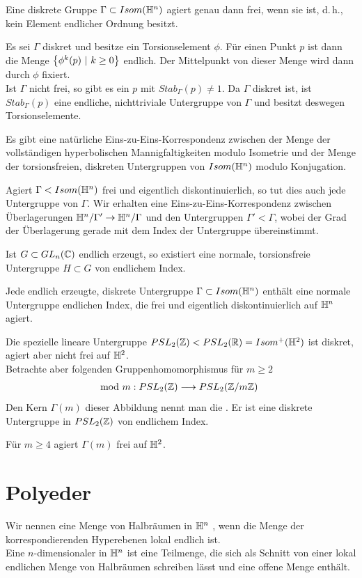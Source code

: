 \documentclass{book}
\begin{document}
\Prop{}
Eine diskrete Gruppe $\Gamma \subset Isom(\mathbb{H}^n)$ agiert genau dann frei, wenn sie  ist, d.\,h., kein Element endlicher Ordnung besitzt.
\begin{Beweis}{}
	Es sei $\Gamma$ diskret und besitze ein Torsionselement $\phi$. Für einen Punkt $p$ ist dann die Menge $\set{\phi^k(p)}{k\geq 0}$ endlich. Der Mittelpunkt von dieser Menge wird dann durch $\phi$ fixiert.\\
	Ist $\Gamma$ nicht frei, so gibt es ein $p$ mit $Stab_\Gamma(p) \neq 1$. Da $\Gamma$ diskret ist, ist $Stab_\Gamma(p)$ eine endliche, nichttriviale Untergruppe von $\Gamma$ und besitzt deswegen Torsionselemente.
\end{Beweis}

\Satz{}
Es gibt eine natürliche Eins-zu-Eins-Korrespondenz zwischen der Menge der vollständigen hyperbolischen Mannigfaltigkeiten modulo Isometrie und der Menge der torsionsfreien, diskreten Untergruppen von $Isom(\mathbb{H}^n)$ modulo Konjugation.

\Satz{}
Agiert $\Gamma < Isom(\mathbb{H}^n)$ frei und eigentlich diskontinuierlich, so tut dies auch jede Untergruppe von $\Gamma$. Wir erhalten eine Eins-zu-Eins-Korrespondenz zwischen Überlagerungen $\mathbb{H}^n / \Gamma' \overset{}{\rightarrow}\mathbb{H}^n / \Gamma$ und den Untergruppen $\Gamma' < \Gamma$, wobei der Grad der Überlagerung gerade mit dem Index der Untergruppe übereinstimmt.

Ist $G \subset GL_n(\mathbb{C})$ endlich erzeugt, so existiert eine normale, torsionsfreie Untergruppe $H \subset G$ von endlichem Index.

\Kor{}
Jede endlich erzeugte, diskrete Untergruppe $\Gamma \subset Isom(\mathbb{H}^n)$ enthält eine normale Untergruppe endlichen Index, die frei und eigentlich diskontinuierlich auf $\mathbb{H}^n$ agiert.

\Def{}
Die spezielle lineare Untergruppe $PSL_2(\mathbb{Z}) < PSL_2(\mathbb{R}) = Isom^+(\mathbb{H}^2)$ ist diskret, agiert aber nicht frei auf $\mathbb{H}^2$.\\
Betrachte aber folgenden Gruppenhomomorphismus für $m\geq 2$
\begin{align*}
\mod m : PSL_2(\mathbb{Z}) & \overset{}{\longrightarrow} PSL_2(\mathbb{Z} / m \mathbb{Z})
\end{align*}
Den Kern $\Gamma(m)$ dieser Abbildung nennt man die . Er ist eine diskrete Untergruppe in $PSL_2(\mathbb{Z})$ von endlichem Index.

\Prop{}
Für $m\geq 4$ agiert $\Gamma(m)$ frei auf $\mathbb{H}^2$.

\section{Polyeder}
\Def{}
Wir nennen eine Menge von Halbräumen in $\mathbb{H}^n$ , wenn die Menge der korrespondierenden Hyperebenen lokal endlich ist.\\
Eine $n$-dimensionaler  in $\mathbb{H}^n$ ist eine Teilmenge, die sich als Schnitt von einer lokal endlichen Menge von Halbräumen schreiben lässt und eine offene Menge enthält.
\end{document}
